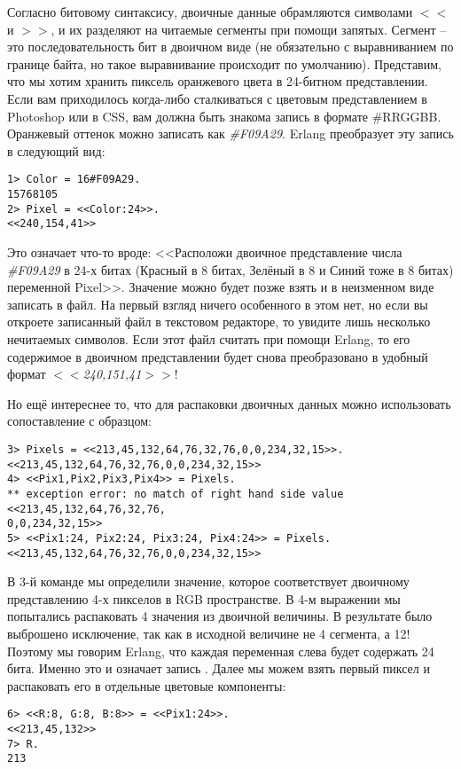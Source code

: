 Согласно битовому синтаксису, двоичные данные обрамляются символами $<<$ и $>>$, и их разделяют на читаемые сегменты при помощи запятых.
Сегмент \--- это последовательность бит в двоичном виде (не обязательно с выравниванием по границе байта, но такое выравнивание происходит по умолчанию).
Представим, что мы хотим хранить пиксель оранжевого цвета в 24\--битном представлении.
Если вам приходилось когда\--либо сталкиваться с цветовым представлением в Photoshop или в CSS, вам должна быть знакома запись в формате \#RRGGBB.
Оранжевый оттенок можно записать как \emph{\#F09A29}.
Erlang преобразует эту запись в следующий вид:
\begin{lstlisting}[style=repl]
1> Color = 16#F09A29.
15768105
2> Pixel = <<Color:24>>.
<<240,154,41>>
\end{lstlisting}

Это означает что\--то вроде: <<Расположи двоичное представление числа \emph{\#F09A29} в 24\--х битах (Красный в 8 битах, Зелёный в 8 и Синий тоже в 8 битах) переменной Pixel>>.
Значение можно будет позже взять и в неизменном виде записать в файл.
На первый взгляд ничего особенного в этом нет, но если вы откроете записанный файл в текстовом редакторе, то увидите лишь несколько нечитаемых символов.
Если этот файл считать при помощи Erlang, то его содержимое в двоичном представлении будет снова преобразовано в удобный формат \emph{$<<$240,151,41$>>$}!

Но ещё интереснее то, что для распаковки двоичных данных можно использовать сопоставление с образцом:
\begin{lstlisting}[style=repl]
3> Pixels = <<213,45,132,64,76,32,76,0,0,234,32,15>>.
<<213,45,132,64,76,32,76,0,0,234,32,15>>
4> <<Pix1,Pix2,Pix3,Pix4>> = Pixels.
** exception error: no match of right hand side value <<213,45,132,64,76,32,76,
0,0,234,32,15>>
5> <<Pix1:24, Pix2:24, Pix3:24, Pix4:24>> = Pixels.
<<213,45,132,64,76,32,76,0,0,234,32,15>>
\end{lstlisting}

В 3\--й команде мы определили значение, которое соответствует двоичному представлению 4\--х пикселов в RGB пространстве.
В 4\--м выражении мы попытались распаковать 4 значения из двоичной величины.
В результате было выброшено исключение, так как в исходной величине не 4 сегмента, а 12!
Поэтому мы говорим Erlang, что каждая переменная слева будет содержать 24 бита.
Именно это и означает запись .
Далее мы можем взять первый пиксел и распаковать его в отдельные цветовые компоненты:
\begin{lstlisting}[style=repl]
6> <<R:8, G:8, B:8>> = <<Pix1:24>>.
<<213,45,132>>
7> R.
213
\end{lstlisting}

